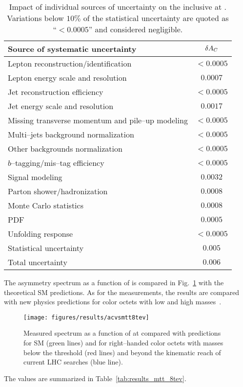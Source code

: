 \begin{table}[!htb]\centering
\begin{tabular}{l c}
\toprule
Source of systematic uncertainty  & $\delta{\ensuremath{A_C}{}}$ \\
\midrule
Lepton reconstruction/identification    & $<0.0005$\\
Lepton energy scale and resolution      &  $0.0007$\\
Jet reconstruction efficiency                 &  $<0.0005$ \\
Jet energy scale and resolution             &  $0.0017$ \\
Missing transverse momentum and pile--up modeling& $<0.0005$\\
Multi--jets background normalization & $<0.0005$\\
Other backgrounds normalization        & $<0.0005$\\
$b$--tagging/mis--tag efficiency       & $<0.0005$\\
Signal modeling                                    & $0.0032$\\
Parton shower/hadronization                & $0.0008$\\
Monte Carlo statistics                            & $0.0008$\\
PDF                                                        &$0.0005$\\
Unfolding response                               &$<0.0005$\\
\midrule
Statistical uncertainty                           & $0.005$ \\
\midrule
Total uncertainty                                   & $0.006$ \\
\bottomrule
\end{tabular}
\caption{
  Impact of individual sources of uncertainty on the inclusive
  \ac{} at \eighttev{}. Variations below $10\%$ of the statistical
  uncertainty are quoted as ``$<0.0005$'' and considered negligible.}
\label{tab:8tevsystematics}
\end{table}

The asymmetry spectrum as a function of \mtt{} is compared in
Fig.~\ref{fig:8tevacvsmtt} with the theoretical SM predictions.
As for the \seventev{} measurements, the results are compared with new
physics predictions for color octets with low and high
masses~\cite{Aguilar-Saavedra:2014nja}.
\begin{figure}[!htb]\centering
  \texttt{[image: figures/results/acvsmtt8tev]}
  \caption{Measured \ac{} spectrum as a function of \mtt{} at
    \seventev{} compared with predictions for SM (green lines) and for right--handed
    color octets with masses below the \ttbar{} threshold (red lines) and beyond
    the kinematic reach of current LHC searches (blue line).}
  \label{fig:8tevacvsmtt}
\end{figure}
The \ac{} values are summarized in Table~\ref{tab:results_mtt_8tev}.


